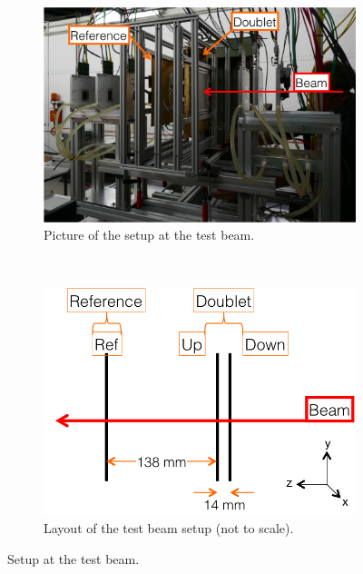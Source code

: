 \documentclass[a4paper,11pt]{article}
\begin{document}
\begin{figure}[h!]
        \centering
         \begin{subfigure}[t]{0.45\textwidth}
   	\includegraphics[keepaspectratio=true, width=\textwidth]{Figures/TBsetup.png}
	\caption{Picture of the setup at the test beam.}
	\label{tb-setup}
        \end{subfigure}
         ~
         \begin{subfigure}[t]{0.45\textwidth}
        \centering
   	\includegraphics[keepaspectratio=true, width=\textwidth]{Figures/TBlayout.png}
	\caption{Layout of the test beam setup (not to scale).}
                \label{tb-layout}
        \end{subfigure}
         \caption{Setup at the test beam.}
        \label{tb}
\end{figure}
\end{document}
